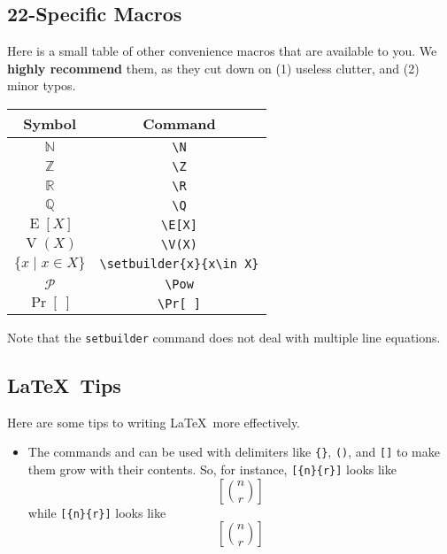{  \subsection{22-Specific Macros}
    Here is a small table of other convenience macros that are available to you.
    We \textbf{highly recommend} them, as they cut down on (1) useless 
    clutter, and (2) minor typos.
    
    \begin{center}
      \begin{tabular}{|c|c|}
        \hline
        \textbf{Symbol} & \textbf{Command} \\\hline
        $\mathbb{N}$ & \texttt{\textbackslash N} \\\hline
        $\mathbb{Z}$ & \texttt{\textbackslash Z} \\\hline
        $\mathbb{R}$ & \texttt{\textbackslash R} \\\hline
        $\mathbb{Q}$ & \texttt{\textbackslash Q} \\\hline
        $\operatorname{E}[X]$ & \texttt{\textbackslash E[X]} \\\hline
        $\operatorname{V}(X)$ & \texttt{\textbackslash V(X)} \\\hline
        $\{x\;|\;x\in X\}$ & \texttt{\textbackslash setbuilder\{x\}\{x\textbackslash in\ X\}} \\\hline
        $\mathcal{P}$ & \texttt{\textbackslash Pow} \\\hline
        $\Pr[\ ]$ & \texttt{\textbackslash Pr[\ ]} \\\hline
      \end{tabular}
    \end{center}
    
    Note that the \texttt{setbuilder} command does not deal with multiple 
    line equations.
  
  \subsection{\LaTeX\ Tips}
    Here are some tips to writing \LaTeX\ more effectively. 
    \begin{itemize}
      \item The commands  and  can be used with delimiters like \texttt{\{\}}, \texttt{()}, and \texttt{[]} to make them grow with their contents. So, for instance, \texttt{[\{n\}\{r\}]} looks like \[[\binom nr]\] while \texttt{[\{n\}\{r\}]} looks like \[\left[\binom nr\right]\]
      

\end{itemize}}
